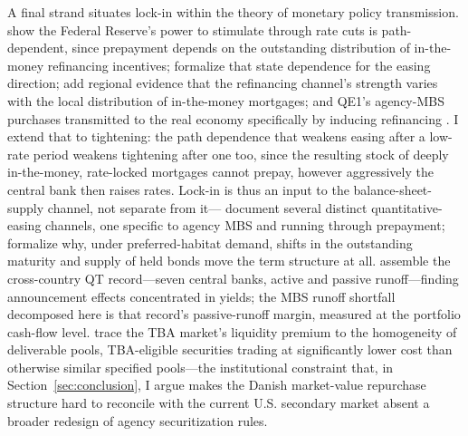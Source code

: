 A final strand situates lock-in within the theory of monetary policy transmission. \citet{berger2021} show the Federal Reserve's power to stimulate through rate cuts is path-dependent, since prepayment depends on the outstanding distribution of in-the-money refinancing incentives; \citet{eichenbaum2022} formalize that state dependence for the easing direction; \citet{beraja2019} add regional evidence that the refinancing channel's strength varies with the local distribution of in-the-money mortgages; and QE1's agency-MBS purchases transmitted to the real economy specifically by inducing refinancing \citep{dimaggio2020}. I extend that to tightening: the path dependence that weakens easing after a low-rate period weakens tightening after one too, since the resulting stock of deeply in-the-money, rate-locked mortgages cannot prepay, however aggressively the central bank then raises rates. Lock-in is thus an input to the balance-sheet-supply channel, not separate from it---\citet{krishnamurthy2011} document several distinct quantitative-easing channels, one specific to agency MBS and running through prepayment; \citet{vayanos2021} formalize why, under preferred-habitat demand, shifts in the outstanding maturity and supply of held bonds move the term structure at all. \citet{du2024} assemble the cross-country QT record---seven central banks, active and passive runoff---finding announcement effects concentrated in yields; the MBS runoff shortfall decomposed here is that record's passive-runoff margin, measured at the portfolio cash-flow level. \citet{vickery2013} trace the TBA market's liquidity premium to the homogeneity of deliverable pools, TBA-eligible securities trading at significantly lower cost than otherwise similar specified pools---the institutional constraint that, in Section~\ref{sec:conclusion}, I argue makes the Danish market-value repurchase structure hard to reconcile with the current U.S. secondary market absent a broader redesign of agency securitization rules.

